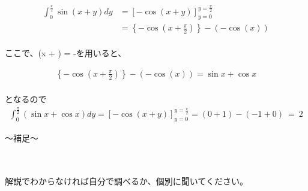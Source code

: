 \documentclass[12pt,a4paper,dvipdfmx]{jsarticle}
\begin{document}
\begin{align*}
    \int_0^{\frac{\pi}{2}} \sin(x+y) dy &= \left[-\cos(x+y)\right]_{y = 0}^{y = \frac{\pi}{2}} \\
    &= \left\{-\cos(x + \frac{\pi}{2})\right\} - \left(-\cos(x)\right) \\
\end{align*}

ここで、\cos\left(x + \right) = -を用いると、

\begin{align*}
    \left\{-\cos(x + \frac{\pi}{2})\right\} - \left(-\cos(x)\right)  = \sin{x} + \cos{x}\\
\end{align*}

となるので \\

\begin{align*}
    \int_0^{\frac{\pi}{2}} (\sin{x} + \cos{x}) dy = \left[- \cos(x+y)\right]_{y = 0}^{y = \frac{\pi}{2}}
    = (0 + 1)-(-1+0) ~=~ 2
\end{align*}

\begin{boxnote}
    〜補足〜
    \begin{center}
        \\
        \\
        解説でわからなければ自分で調べるか、個別に聞いてください。
    \end{center}
\end{boxnote}
\end{document}
